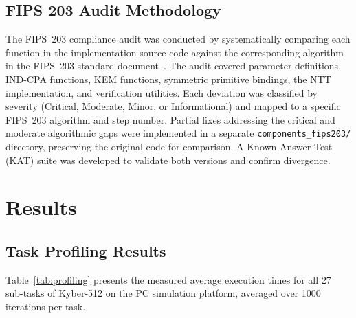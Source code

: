 \documentclass[journal]{IEEEtran}
\begin{document}
\subsection{FIPS 203 Audit Methodology}

The FIPS~203 compliance audit was conducted by systematically comparing each function in the implementation source code against the corresponding algorithm in the FIPS~203 standard document~\cite{fips203}. The audit covered parameter definitions, IND-CPA functions, KEM functions, symmetric primitive bindings, the NTT implementation, and verification utilities. Each deviation was classified by severity (Critical, Moderate, Minor, or Informational) and mapped to a specific FIPS~203 algorithm and step number. Partial fixes addressing the critical and moderate algorithmic gaps were implemented in a separate \texttt{components\_fips203/} directory, preserving the original code for comparison. A Known Answer Test (KAT) suite was developed to validate both versions and confirm divergence.


\section{Results}

\subsection{Task Profiling Results}

Table~\ref{tab:profiling} presents the measured average execution times for all 27 sub-tasks of Kyber-512 on the PC simulation platform, averaged over 1000 iterations per task.
\end{document}

